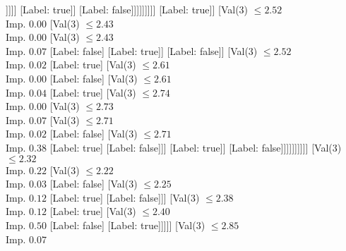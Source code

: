 \documentclass[margin=10pt]{standalone}
\begin{document}
\begin{forest}
																						[Val($3$) $ \leq 2.37$ \\ Imp. $0.00$
																							[Label: false]
																							[Val($3$) $ \leq 2.37$ \\ Imp. $0.07$
																								[Label: true]
																								[Val($3$) $ \leq 2.38$ \\ Imp. $0.00$
																									[Label: false]
																									[Val($3$) $ \leq 2.38$ \\ Imp. $0.17$
																										[Label: true]
																										[Label: false]]]]]
																						[Label: true]]
																					[Label: false]]]]]]]]]
													[Label: true]]
												[Val($3$) $ \leq 2.52$ \\ Imp. $0.00$
													[Val($3$) $ \leq 2.43$ \\ Imp. $0.00$
														[Val($3$) $ \leq 2.43$ \\ Imp. $0.07$
															[Label: false]
															[Label: true]]
														[Label: false]]
													[Val($3$) $ \leq 2.52$ \\ Imp. $0.02$
														[Label: true]
														[Val($3$) $ \leq 2.61$ \\ Imp. $0.00$
															[Label: false]
															[Val($3$) $ \leq 2.61$ \\ Imp. $0.04$
																[Label: true]
																[Val($3$) $ \leq 2.74$ \\ Imp. $0.00$
																	[Val($3$) $ \leq 2.73$ \\ Imp. $0.07$
																		[Val($3$) $ \leq 2.71$ \\ Imp. $0.02$
																			[Label: false]
																			[Val($3$) $ \leq 2.71$ \\ Imp. $0.38$
																				[Label: true]
																				[Label: false]]]
																		[Label: true]]
																	[Label: false]]]]]]]]]]
								[Val($3$) $ \leq 2.32$ \\ Imp. $0.22$
									[Val($3$) $ \leq 2.22$ \\ Imp. $0.03$
										[Label: false]
										[Val($3$) $ \leq 2.25$ \\ Imp. $0.12$
											[Label: true]
											[Label: false]]]
									[Val($3$) $ \leq 2.38$ \\ Imp. $0.12$
										[Label: true]
										[Val($3$) $ \leq 2.40$ \\ Imp. $0.50$
											[Label: false]
											[Label: true]]]]]
							[Val($3$) $ \leq 2.85$ \\ Imp. $0.07$

\end{forest}
\end{document}
